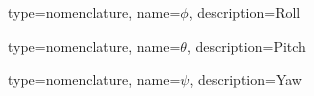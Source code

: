 {
	type=nomenclature,
	name={$\phi$},
	description={Roll}
}

{
	type=nomenclature,
	name={$\theta$},
	description={Pitch}
}

{
	type=nomenclature,
	name={$\psi$},
	description={Yaw}
}